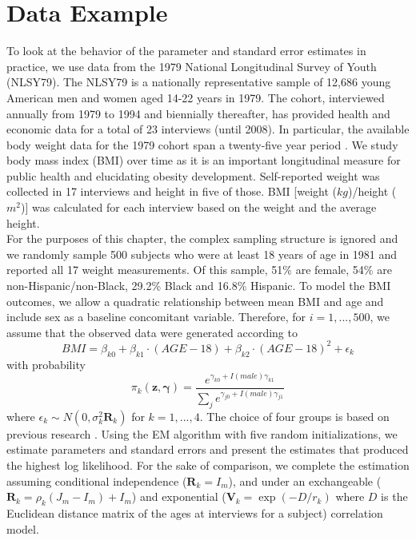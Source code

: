 \documentclass[10pt]{article}
\newcommand{\B}[0]{\mathbf}
\newcommand{\bs}[0]{\boldsymbol}
\begin{document}
\section{Data Example}
To look at the behavior of the parameter and standard error estimates in practice, we use data from the 1979 National Longitudinal Survey of Youth (NLSY79). The NLSY79 is a nationally representative sample of 12,686 young American men and women aged 14-22 years in 1979. The cohort, interviewed annually from 1979 to 1994 and biennially thereafter, has provided health and economic data for a total of 23 interviews (until 2008).  In particular, the available body weight data for the 1979 cohort span a twenty-five year period \cite{ostbye2011}. We study body mass index (BMI) over time as it is an important longitudinal measure for public health and elucidating obesity development.  Self-reported weight was collected in 17 interviews and height in five of those. BMI [weight ($kg$)/height ($m^{2}$)] was calculated for each interview based on the weight and the average height.\\

For the purposes of this chapter, the complex sampling structure is ignored and we randomly sample 500 subjects who were at least 18 years of age in 1981 and reported all 17 weight measurements. Of this sample, 51\% are female, 54\% are non-Hispanic/non-Black, 29.2\% Black and 16.8\% Hispanic. To model the BMI outcomes, we allow a quadratic relationship between mean BMI and age and include sex as a baseline concomitant variable. Therefore, for $i=1,...,500$, we assume that the observed data were generated according to
$$BMI=\beta_{k0}+\beta_{k1}\cdot (AGE-18)+\beta_{k2}\cdot (AGE-18)^{2}+\epsilon_{k}$$
with probability
$$\pi_{k}(\B z,\bs\gamma)=\frac{e^{\gamma_{k0}+I(male)\gamma_{k1}}}{\sum_{j}e^{\gamma_{j0}+I(male)\gamma_{j1}}}$$
where $\epsilon_{k}\sim N(0,\sigma_{k}^{2}\B R_k)$
for $k=1,...,4$. The choice of four groups is based on previous research \cite{ostbye2011}. Using the EM algorithm with five random initializations, we estimate parameters and standard errors and present the estimates that produced the highest log likelihood. For the sake of comparison, we complete the estimation assuming conditional independence ($\B R_k  = I_m$), and under an exchangeable ($\B R_k = \rho_k(J_m - I_m)+I_m$) and exponential ($\B V_k = \exp(-D/r_k)$ where $D$ is the Euclidean distance matrix of the ages at interviews for a subject) correlation model.
\end{document}
